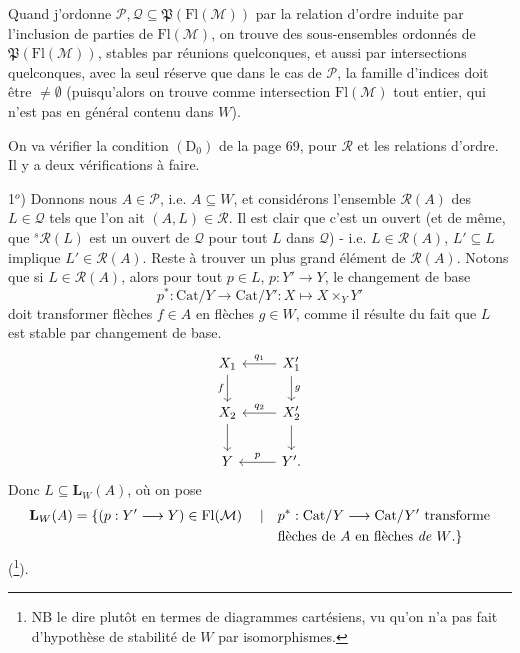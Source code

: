 \documentclass[11pt]{article}
\newcommand{\printedpage}[1]{\marginpar{\footnotesize p.~#1}}
\def\dcprintedpending{}
\newcommand{\msp}[1]{\marginpar{\footnotesize\raggedright
  \ifx\dcprintedpending\empty\else p.~\dcprintedpending\par\fi
  [#1]}\gdef\dcprintedpending{}}
\newcommand{\Fl}{\mathrm{Fl}}
\newcommand{\Pf}{\mathfrak{P}}
\begin{document}
\msp{page 84}Quand j'ordonne $\mathcal{P},\mathcal{Q}\subseteq\Pf(\Fl(\mathcal{M}))$ par la relation d'ordre induite par l'inclusion de parties de $\Fl(\mathcal{M})$, on trouve des sous-ensembles ordonnés de $\Pf(\Fl(\mathcal{M}))$, stables par réunions quelconques, et aussi par intersections quelconques, avec la seul réserve que dans le cas de $\mathcal{P}$, la famille d'indices doit être $\neq\emptyset$ (puisqu'alors on trouve comme intersection $\Fl(\mathcal{M})$ tout entier, qui n'est pas en général contenu dans $W$). %

On va vérifier la condition $(\mathrm{D}_0)$ de la page 69, pour $\mathcal{R}$ et les relations d'ordre. Il y a deux vérifications à faire.

1$^{o}$) Donnons nous $A\in\mathcal{P}$, i.e. $A\subseteq W$, et considérons l'ensemble $\mathcal{R}(A)$ des $L\in\mathcal{Q}$ tels que l'on ait $(A,L)\in\mathcal{R}$. Il est clair que c'est un ouvert (et de même, que ${}^{s}\mathcal{R}(L)$ est un ouvert de $\mathcal{Q}$ pour tout $L$ dans $\mathcal{Q}$) - i.e. $L\in\mathcal{R}(A)$, $L'\subseteq L$ implique %
\printedpage{52}
$L'\in\mathcal{R}(A)$. Reste à trouver un plus grand élément de $\mathcal{R}(A)$. Notons que si $L\in\mathcal{R}(A)$, alors pour tout $p\in L$, $p : Y'\longrightarrow Y$, le changement de base
\[
p^{*} : \mathrm{Cat}/Y\longrightarrow\mathrm{Cat}/Y' : X\longmapsto X\times_{Y}Y'
\]
doit transformer flèches $f\in A$ en flèches $g\in W$, comme il résulte du fait que $L$ est stable par changement de base.
\[
\begin{tikzcd}
X_1 \arrow[d, "f"'] & X'_1 \arrow[l, "q_1"'] \arrow[d, "g"] \\
X_2 \arrow[d] & X'_2 \arrow[l, "q_2"'] \arrow[d] \\
Y & Y'. \arrow[l, "p"']
\end{tikzcd}
\]
Donc $L\subseteq\mathbf{L}_W(A)$, où on pose
\msp{page 85}
\[
\begin{aligned}
\mathbf{L}_W(A)=\{(p : Y'\longrightarrow Y)\in\Fl(\mathcal{M})\quad\mid\quad & p^{*} : \mathrm{Cat}/Y\longrightarrow\mathrm{Cat}/Y'\ \text{transforme}\\
& \text{flèches de $A$ en flèches \textit{de} $W$.}\}
\end{aligned}
\]
(\footnote{NB le dire plutôt en termes de diagrammes cartésiens, vu qu'on n'a pas fait d'hypothèse de stabilité de $W$ par isomorphismes.}).
\end{document}
